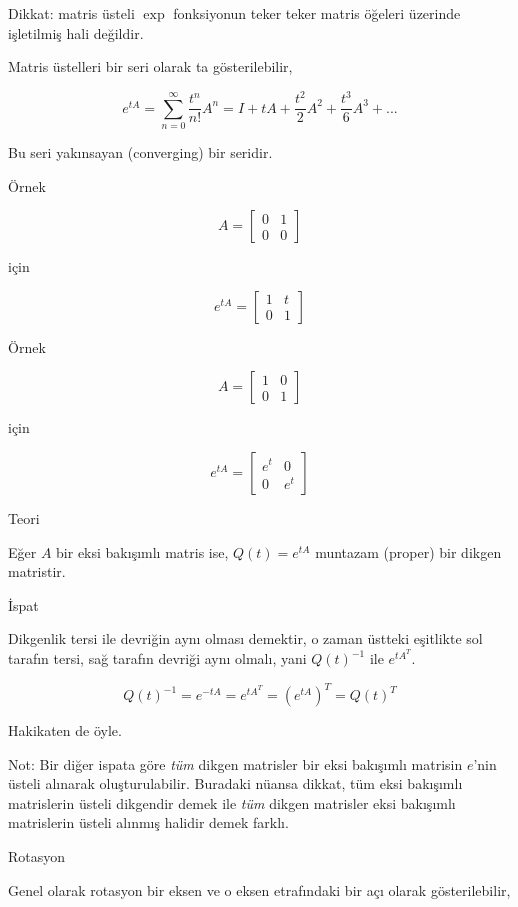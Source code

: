 \documentclass[12pt,fleqn]{article}\usepackage{../../common}
\begin{document}
Dikkat: matris üsteli $\exp$ fonksiyonun teker teker matris öğeleri
üzerinde işletilmiş hali değildir.

Matris üstelleri bir seri olarak ta gösterilebilir, 

$$ e^{tA} = \sum_{n=0}^{\infty} \frac{t^n}{n!} A^n = 
I + tA + \frac{t^2}{2}A^2 + \frac{t^3}{6}A^3 + ...
$$

Bu seri yakınsayan (converging) bir seridir. 

Örnek

$$ A = \left[\begin{array}{rrr}
0 & 1 \\ 0 & 0
\end{array}\right] $$

için 

$$ e^{tA} = \left[\begin{array}{rrr}
1 & t \\ 0 & 1
\end{array}\right] $$

Örnek

$$ A = \left[\begin{array}{rrr}
1 & 0 \\ 0 & 1
\end{array}\right] $$

için 

$$ e^{tA} = \left[\begin{array}{rrr}
e^t & 0 \\ 0 & e^t
\end{array}\right] $$

Teori 

Eğer $A$ bir eksi bakışımlı matris ise, $Q(t) = e^{tA}$ muntazam 
(proper) bir dikgen matristir. 

İspat 

Dikgenlik tersi ile devriğin aynı olması demektir, o zaman üstteki
eşitlikte sol tarafın tersi, sağ tarafın devriği aynı olmalı, yani
$Q(t)^{-1}$ ile $e^{tA^T}$.

$$ Q(t)^{-1} = e^{-tA} = e^{tA^T} = (e^{tA})^T = Q(t)^T $$

Hakikaten de öyle. 

Not: Bir diğer ispata göre {\em tüm} dikgen matrisler bir eksi bakışımlı
matrisin $e$'nin üsteli alınarak oluşturulabilir. Buradaki nüansa dikkat,
tüm eksi bakışımlı matrislerin üsteli dikgendir demek ile {\em tüm} dikgen
matrisler eksi bakışımlı matrislerin üsteli alınmış halidir demek farklı.

Rotasyon

Genel olarak rotasyon bir eksen ve o eksen etrafındaki bir açı olarak
gösterilebilir,
\end{document}
